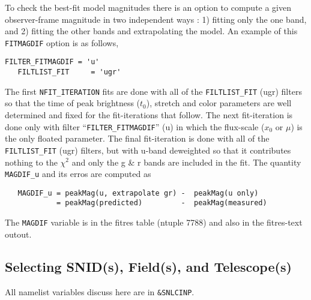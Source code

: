\documentclass[12pt]{article}
\begin{document}
To check the best-fit model magnitudes there is an 
option to compute a given observer-frame magnitude 
in two independent ways : 1) fitting only the one band,
and 2) fitting the other bands and extrapolating the
model.  An example of this {\tt FITMAGDIF} option is
as follows,
%
\begin{Verbatim}[frame=single]
   FILTER_FITMAGDIF = 'u'
   FILTLIST_FIT     = 'ugr'
\end{Verbatim}
%
The first {\tt NFIT\_ITERATION} fits are done with
all of the {\tt FILTLIST\_FIT} (ugr) filters so that
the time of peak brightness ($t_0$), stretch and color
parameters are well determined and fixed for the fit-iterations
that follow.  The next fit-iteration is done only
with filter ``{\tt FILTER\_FITMAGDIF}'' (u) in which
the flux-scale ($x_0$ or $\mu$) is the only floated parameter.
The final fit-iteration is done with all of the
{\tt FILTLIST\_FIT} (ugr) filters, but with u-band 
deweighted so that it contributes nothing to the $\chi^2$
and only the g \& r bands are included in the fit.
The quantity {\tt MAGDIF\_u} and its erros are computed as
\begin{verbatim}
   MAGDIF_u = peakMag(u, extrapolate gr) -  peakMag(u only) 
            = peakMag(predicted)         -  peakMag(measured)
\end{verbatim}
The {\tt MAGDIF} variable is in the fitres table (ntuple 7788)
and also in the fitres-text outout.

   \subsection{Selecting SNID(s), Field(s), and Telescope(s) }
   \label{subsec:select}

All namelist variables discuss here are in {\tt \&SNLCINP}.


\end{document}
